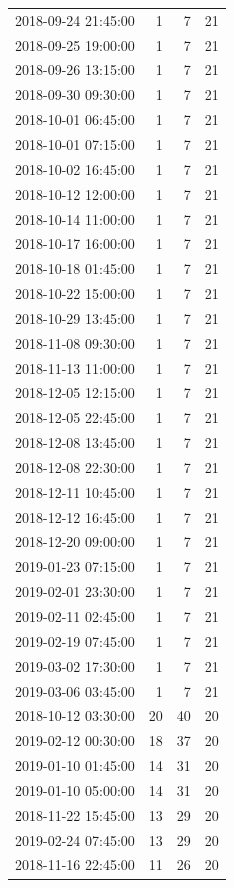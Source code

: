 \begin{tabular}{lrrr}
2018-09-24 21:45:00 & 1 & 7 & 21 \\
2018-09-25 19:00:00 & 1 & 7 & 21 \\
2018-09-26 13:15:00 & 1 & 7 & 21 \\
2018-09-30 09:30:00 & 1 & 7 & 21 \\
2018-10-01 06:45:00 & 1 & 7 & 21 \\
2018-10-01 07:15:00 & 1 & 7 & 21 \\
2018-10-02 16:45:00 & 1 & 7 & 21 \\
2018-10-12 12:00:00 & 1 & 7 & 21 \\
2018-10-14 11:00:00 & 1 & 7 & 21 \\
2018-10-17 16:00:00 & 1 & 7 & 21 \\
2018-10-18 01:45:00 & 1 & 7 & 21 \\
2018-10-22 15:00:00 & 1 & 7 & 21 \\
2018-10-29 13:45:00 & 1 & 7 & 21 \\
2018-11-08 09:30:00 & 1 & 7 & 21 \\
2018-11-13 11:00:00 & 1 & 7 & 21 \\
2018-12-05 12:15:00 & 1 & 7 & 21 \\
2018-12-05 22:45:00 & 1 & 7 & 21 \\
2018-12-08 13:45:00 & 1 & 7 & 21 \\
2018-12-08 22:30:00 & 1 & 7 & 21 \\
2018-12-11 10:45:00 & 1 & 7 & 21 \\
2018-12-12 16:45:00 & 1 & 7 & 21 \\
2018-12-20 09:00:00 & 1 & 7 & 21 \\
2019-01-23 07:15:00 & 1 & 7 & 21 \\
2019-02-01 23:30:00 & 1 & 7 & 21 \\
2019-02-11 02:45:00 & 1 & 7 & 21 \\
2019-02-19 07:45:00 & 1 & 7 & 21 \\
2019-03-02 17:30:00 & 1 & 7 & 21 \\
2019-03-06 03:45:00 & 1 & 7 & 21 \\
2018-10-12 03:30:00 & 20 & 40 & 20 \\
2019-02-12 00:30:00 & 18 & 37 & 20 \\
2019-01-10 01:45:00 & 14 & 31 & 20 \\
2019-01-10 05:00:00 & 14 & 31 & 20 \\
2018-11-22 15:45:00 & 13 & 29 & 20 \\
2019-02-24 07:45:00 & 13 & 29 & 20 \\
2018-11-16 22:45:00 & 11 & 26 & 20 \\

\end{tabular}
